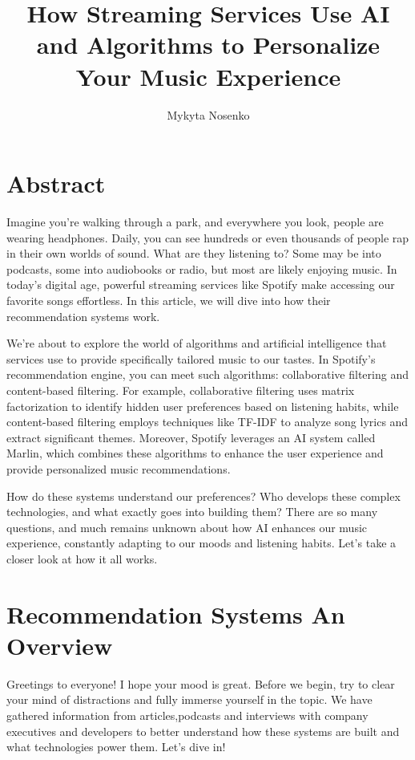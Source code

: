 \documentclass[12pt,a4paper]{article}
\title{How Streaming Services Use AI and Algorithms to Personalize Your Music Experience}
\author{Mykyta Nosenko}
\begin{document}
\maketitle
\section*{Abstract}

Imagine you’re walking through a park, and everywhere you look, people are wearing headphones. Daily, you can see hundreds or even thousands of people rap in their own worlds of sound. What are they listening to? Some may be into podcasts, some into audiobooks or radio, but most are likely enjoying music. In today’s digital age, powerful streaming services like Spotify make accessing our favorite songs effortless. In this article, we will dive into how their recommendation systems work.

We’re about to explore the world of algorithms and artificial intelligence that services use to provide specifically tailored music to our tastes. In Spotify’s recommendation engine, you can meet such algorithms: collaborative filtering and content-based filtering. For example, collaborative filtering uses matrix factorization to identify hidden user preferences based on listening habits, while content-based filtering employs techniques like TF-IDF to analyze song lyrics and extract significant themes. Moreover, Spotify leverages an AI system called Marlin, which combines these algorithms to enhance the user experience and provide personalized music recommendations\citep{href}.

How do these systems understand our preferences? Who develops these complex technologies, and what exactly goes into building them? There are so many questions, and much remains unknown about how AI enhances our music experience, constantly adapting to our moods and listening habits. Let's take a closer look at how it all works.

\newpage
\tableofcontents
\newpage

\section{Recommendation Systems An Overview}

Greetings to everyone! I hope your mood is great. Before we begin, try to clear your mind of distractions and fully immerse yourself in the topic. We have gathered information from articles,podcasts and interviews with company executives and developers to better understand how these systems are built and what technologies power them.  Let's dive in!
\end{document}
